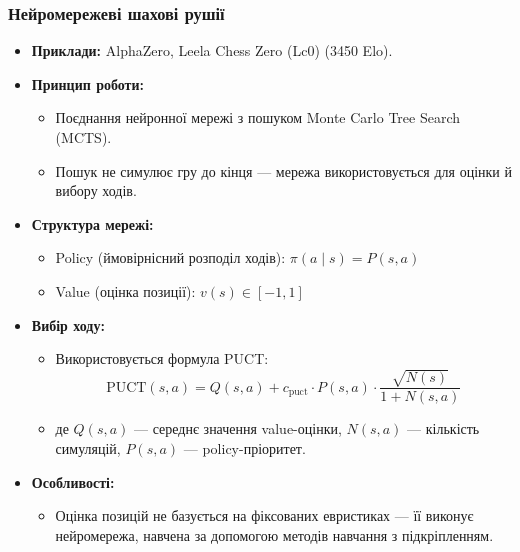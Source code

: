 \documentclass[
    10pt,
]{beamer}
\begin{document}
\begin{frame}[t]
    \frametitle{Нейромережеві шахові рушії}

    \begin{itemize}
        \item \textbf{Приклади:} AlphaZero, Leela Chess Zero (Lc0) (3450 Elo).

        \item \textbf{Принцип роботи:}
        \begin{itemize}
            \item Поєднання нейронної мережі з пошуком Monte Carlo Tree Search (MCTS).
            \item Пошук не симулює гру до кінця — мережа використовується для оцінки й вибору ходів.
        \end{itemize}

        \item \textbf{Структура мережі:}
        \begin{itemize}
            \item {Policy (ймовірнісний розподіл ходів):} \(\pi(a \mid s) = P(s, a)\)
            \item {Value (оцінка позиції):} \(v(s) \in [-1, 1]\)
        \end{itemize}

        \item \textbf{Вибір ходу:}
        \begin{itemize}
            \item Використовується формула PUCT:
            \[
                \text{PUCT}(s, a) = Q(s, a) + c_{\text{puct}} \cdot P(s, a) \cdot \frac{\sqrt{N(s)}}{1 + N(s, a)}
            \]
            \item де \(Q(s, a)\) — середнє значення value-оцінки, \(N(s, a)\) — кількість симуляцій, \(P(s, a)\) — policy-пріоритет.
        \end{itemize}

        \item \textbf{Особливості:}
        \begin{itemize}
            \item Оцінка позицій не базується на фіксованих евристиках — її виконує нейромережа, навчена за допомогою методів навчання з підкріпленням.
        \end{itemize}
    \end{itemize}
\end{frame}
\end{document}
